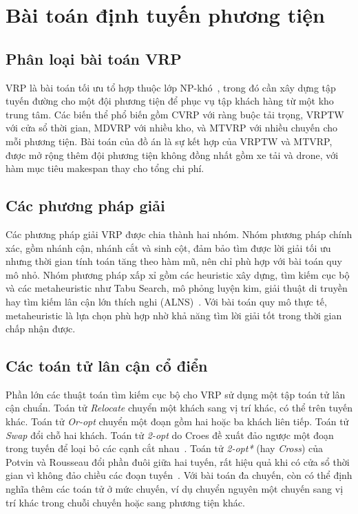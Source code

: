 \documentclass[../DoAn.tex]{subfiles}
\begin{document}
\section{Bài toán định tuyến phương tiện}
\label{sec:vrp}

\subsection{Phân loại bài toán VRP}

VRP là bài toán tối ưu tổ hợp thuộc lớp NP-khó~\cite{lenstra1981complexity}, trong đó cần xây dựng tập tuyến đường cho một đội phương tiện để phục vụ tập khách hàng từ một kho trung tâm. Các biến thể phổ biến gồm CVRP với ràng buộc tải trọng, VRPTW với cửa sổ thời gian, MDVRP với nhiều kho, và MTVRP với nhiều chuyến cho mỗi phương tiện. Bài toán của đồ án là sự kết hợp của VRPTW và MTVRP, được mở rộng thêm đội phương tiện không đồng nhất gồm xe tải và drone, với hàm mục tiêu makespan thay cho tổng chi phí.

\subsection{Các phương pháp giải}

Các phương pháp giải VRP được chia thành hai nhóm. Nhóm phương pháp chính xác, gồm nhánh cận, nhánh cắt và sinh cột, đảm bảo tìm được lời giải tối ưu nhưng thời gian tính toán tăng theo hàm mũ, nên chỉ phù hợp với bài toán quy mô nhỏ. Nhóm phương pháp xấp xỉ gồm các heuristic xây dựng, tìm kiếm cục bộ và các metaheuristic như Tabu Search, mô phỏng luyện kim, giải thuật di truyền hay tìm kiếm lân cận lớn thích nghi (ALNS)~\cite{ropke2006adaptive}. Với bài toán quy mô thực tế, metaheuristic là lựa chọn phù hợp nhờ khả năng tìm lời giải tốt trong thời gian chấp nhận được.

\subsection{Các toán tử lân cận cổ điển}

Phần lớn các thuật toán tìm kiếm cục bộ cho VRP sử dụng một tập toán tử lân cận chuẩn. Toán tử \textit{Relocate} chuyển một khách sang vị trí khác, có thể trên tuyến khác. Toán tử \textit{Or-opt} chuyển một đoạn gồm hai hoặc ba khách liên tiếp. Toán tử \textit{Swap} đổi chỗ hai khách. Toán tử \textit{2-opt} do Croes đề xuất đảo ngược một đoạn trong tuyến để loại bỏ các cạnh cắt nhau~\cite{croes1958method}. Toán tử \textit{2-opt*} (hay \textit{Cross}) của Potvin và Rousseau đổi phần đuôi giữa hai tuyến, rất hiệu quả khi có cửa sổ thời gian vì không đảo chiều các đoạn tuyến~\cite{potvin1995exchange}. Với bài toán đa chuyến, còn có thể định nghĩa thêm các toán tử ở mức chuyến, ví dụ chuyển nguyên một chuyến sang vị trí khác trong chuỗi chuyến hoặc sang phương tiện khác.
\end{document}
